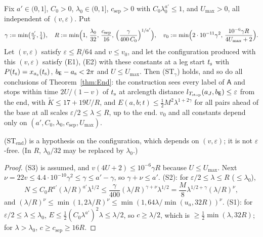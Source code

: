 \begin{corollary}\label{cor:End}
Fix $a'\in(0,1]$, $C_0>0$, $\lambda_0\in(0,1]$, $c_{\mathrm{sep}}>0$ with $C_0\lambda_0^{a'}\le1$, and $U_{\max}>0$, all independent
of $(v,\varepsilon)$. Put
\[
\gamma:=\min\bigl(\tfrac{a'}2,\tfrac14\bigr),\quad R:=\min\Bigl(1,\,\frac{\lambda_0}{32},\,\frac{c_{\mathrm{sep}}}{16},\,
\Bigl(\frac\gamma{400\,C_0}\Bigr)^{1/a'}\Bigr),\quad
v_0:=\min\Bigl(2\cdot10^{-11}\gamma^2,\,\frac{10^{-6}\gamma R}{4U_{\max}+2}\Bigr).
\]
Let $(v,\varepsilon)$ satisfy $\varepsilon\le R/64$ and $v\le v_0$, and let the configuration produced with this $(v,\varepsilon)$
satisfy \textup{(E1)}, \textup{(E2)} with these constants at a leg start $t_{\mathrm s}$ with $P(t_{\mathrm s})=x_{a_{\mathrm s}}(t_{\mathrm s})$,
$b_{\mathsf E}-a_{\mathrm s}<2\pi$ and $U\le U_{\max}$. Then \textup{(ST$_\gamma$)} holds, and so do all conclusions of Theorem~\ref{thm:End}:
the construction sees every label of $\mathsf A$ and stops within time $2U/(1-v)$ of $t_{\mathrm s}$ at arclength distance
$l_{T_{\mathrm{stop}}}(a_J,b_{\mathsf E})\le\varepsilon$ from the end, with $\tilde K\le17+19U/R$, and
$E(a,b;t)\le\frac12M^2\lambda^{1+2\gamma}$ for all pairs ahead of the base at all scales $\varepsilon/2\le\lambda\le R$, up to the
end. $v_0$ and all constants depend only on $(a',C_0,\lambda_0,c_{\mathrm{sep}},U_{\max})$.
\end{corollary}
\textup{(ST$_{\mathrm{end}}$)} is a hypothesis on the configuration, which depends on $(v,\varepsilon)$; it is not
$\varepsilon$-free. (In $R$, $\lambda_0/32$ may be replaced by $\lambda_0$.)
\begin{proof}
(S3) is assumed, and $v(4U+2)\le10^{-6}\gamma R$ because $U\le U_{\max}$. Next $\nu=22v\le4.4\cdot10^{-10}\gamma^2\le\gamma\le
a'-\gamma$, so $\gamma+\nu\le a'$. (S2): for $\varepsilon/2\le\lambda\le R$ ($\le\lambda_0$),
\[
N\le C_0R^{a'}(\lambda/R)^{a'}\lambda^{1/2}\le\frac\gamma{400}(\lambda/R)^{\gamma+\nu}\lambda^{1/2}
=\frac M8\lambda^{1/2+\gamma}(\lambda/R)^\nu,
\]
and $(\lambda/R)^\nu\le\min(1,2\lambda/R)^\nu\le\min(1,64\lambda/\min(u_a,32R))^\nu$. (S1): for
$\varepsilon/2\le\lambda\le\lambda_0$, $E\le\frac12(C_0\lambda^{a'})^2\lambda\le\lambda/2$, so $c\ge\lambda/2$, which is
$\ge\frac12\min(\lambda,32R)$; for $\lambda>\lambda_0$, $c\ge c_{\mathrm{sep}}\ge16R$.
\end{proof}

